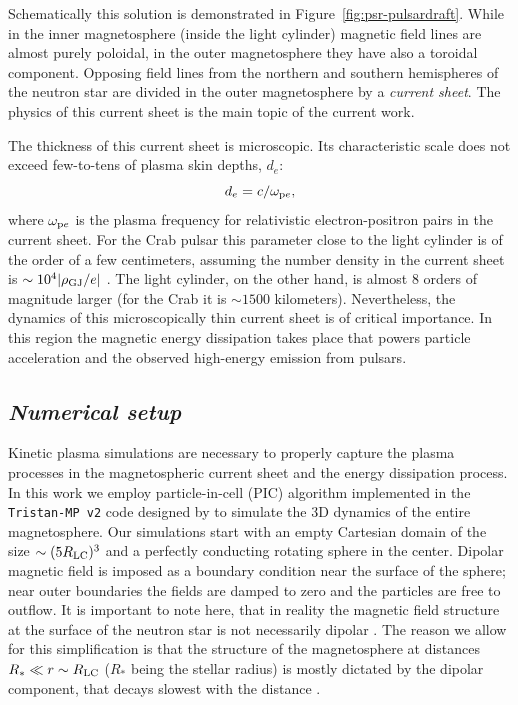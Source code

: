 Schematically this solution is demonstrated in Figure~\ref{fig:psr-pulsardraft}. While in the inner magnetosphere (inside the light cylinder) magnetic field lines are almost purely poloidal, in the outer magnetosphere they have also a toroidal component. Opposing field lines from the northern and southern hemispheres of the neutron star are divided in the outer magnetosphere by a \emph{current sheet}. The physics of this current sheet is the main topic of the current work. 

The thickness of this current sheet is microscopic. Its characteristic scale does not exceed few-to-tens of plasma skin depths, $d_e$:
\begin{equation}
    d_e = c/\omega_{{\rm p}e},
\end{equation}
\noindent where $\omega_{{\rm p}e}$ is the plasma frequency for relativistic electron-positron pairs in the current sheet. For the Crab pulsar this parameter close to the light cylinder is of the order of a few centimeters, assuming the number density in the current sheet is $\sim 10^4|\rho_{\rm GJ}/e|$ \citep{1996A&A...311..172L}. The light cylinder, on the other hand, is almost $8$ orders of magnitude larger (for the Crab it is $\sim 1500$ kilometers). Nevertheless, the dynamics of this microscopically thin current sheet is of critical importance. In this region the magnetic energy dissipation takes place that powers particle acceleration and the observed high-energy emission from pulsars.

\subsection*{\small\it Numerical setup}

Kinetic plasma simulations are necessary to properly capture the plasma processes in the magnetospheric current sheet and the energy dissipation process. In this work we employ particle-in-cell (PIC) algorithm implemented in the \texttt{Tristan-MP v2} code designed by \cite{tristanv2} to simulate the 3D dynamics of the entire magnetosphere. Our simulations start with an empty Cartesian domain of the size $\sim (5 R_{\rm LC})^3$ and a perfectly conducting rotating sphere in the center. Dipolar magnetic field is imposed as a boundary condition near the surface of the sphere; near outer boundaries the fields are damped to zero and the particles are free to outflow. It is important to note here, that in reality the magnetic field structure at the surface of the neutron star is not necessarily dipolar \citep{2019ApJ...887L..23B}. The reason we allow for this simplification is that the structure of the magnetosphere at distances $R_*\ll r\sim R_{\rm LC}$ ($R_*$ being the stellar radius) is mostly dictated by the dipolar component, that decays slowest with the distance \citep{2020ApJ...893L..38C}. 

